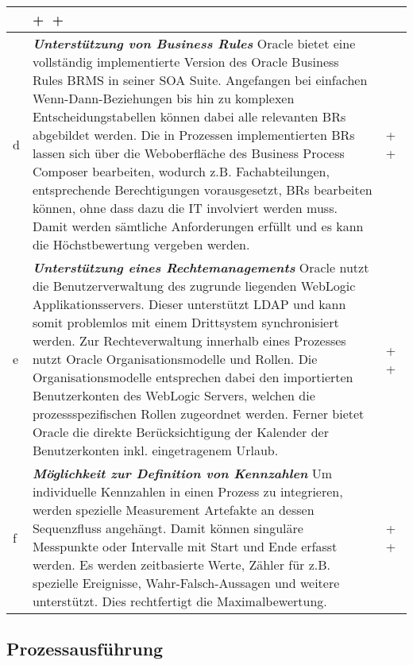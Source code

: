 \begin{longtabu}{@{\extracolsep{\fill}}|p{0.5cm}|X|p{2cm}|}
 & \centering\arraybackslash \textcircled{+} \textcircled{+} \tabularnewline
\hline
 d 
 & \textit{\textbf{Unterstützung von Business Rules}} \newline  Oracle bietet eine vollständig implementierte Version des Oracle Business Rules \ac{BRMS} in seiner SOA Suite. Angefangen bei einfachen Wenn-Dann-Beziehungen bis hin zu komplexen Entscheidungstabellen können dabei alle relevanten \ac{BR}s abgebildet werden. Die in Prozessen implementierten \ac{BR}s lassen sich über die Weboberfläche des Business Process Composer bearbeiten, wodurch z.B. Fachabteilungen, entsprechende Berechtigungen vorausgesetzt, \ac{BR}s bearbeiten können, ohne dass dazu die IT involviert werden muss. Damit werden sämtliche Anforderungen erfüllt und es kann die Höchstbewertung vergeben werden. \smallskip
 & \centering\arraybackslash \textcircled{+} \textcircled{+} \tabularnewline
\hline
 e 
 & \textit{\textbf{Unterstützung eines Rechtemanagements}} \newline  Oracle nutzt die Benutzerverwaltung des zugrunde liegenden WebLogic Applikationsservers. Dieser unterstützt \ac{LDAP} und kann somit problemlos mit einem Drittsystem synchronisiert werden. Zur Rechteverwaltung innerhalb eines Prozesses nutzt Oracle Organisationsmodelle und Rollen. Die Organisationsmodelle entsprechen dabei den importierten Benutzerkonten des WebLogic Servers, welchen die prozessspezifischen Rollen zugeordnet werden. Ferner bietet Oracle die direkte Berücksichtigung der Kalender der Benutzerkonten inkl. eingetragenem Urlaub. \smallskip
 & \centering\arraybackslash \textcircled{+} \textcircled{+} \tabularnewline
\hline
 f \label{oracleMeassurePoint}
 & \textit{\textbf{Möglichkeit zur Definition von Kennzahlen}} \newline  Um individuelle Kennzahlen in einen Prozess zu integrieren, werden spezielle Measurement Artefakte an dessen Sequenzfluss angehängt. Damit können singuläre Messpunkte oder Intervalle mit Start und Ende erfasst werden. Es werden zeitbasierte Werte, Zähler für z.B. spezielle Ereignisse, Wahr-Falsch-Aussagen und weitere unterstützt. Dies rechtfertigt die Maximalbewertung. \smallskip
 & \centering\arraybackslash \textcircled{+} \textcircled{+} \tabularnewline
\hline
\end{longtabu}
\normalsize


\subsection{Prozessausführung}

